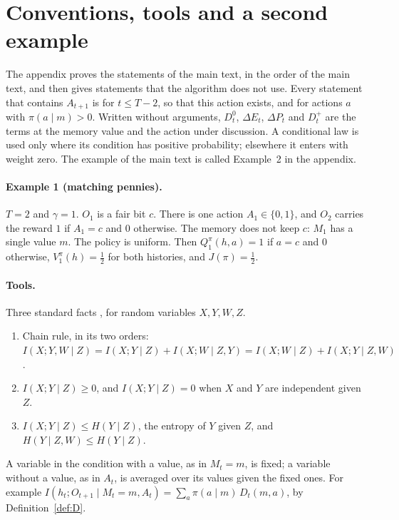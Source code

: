 \documentclass{article}
\newcounter{algo}
\theoremstyle{definition}
\newcommand{\dE}{\Delta E}
\newcommand{\dP}{\Delta P}
\begin{document}
\section{Conventions, tools and a second example}\label{sec:conv}

The appendix proves the statements of the main text, in the order of the main text, and then gives statements that the algorithm does not use. Every statement that contains $A_{t+1}$ is for $t\le T-2$, so that this action exists, and for actions $a$ with $\pi(a\mid m)>0$. Written without arguments, $D^0_t$, $\dE_t$, $\dP_t$ and $D^+_t$ are the terms at the memory value and the action under discussion. A conditional law is used only where its condition has positive probability; elsewhere it enters with weight zero. The example of the main text is called Example~2 in the appendix.

\paragraph{Example 1 (matching pennies).} $T=2$ and $\gamma=1$. $O_1$ is a fair bit $c$. There is one action $A_1\in\{0,1\}$, and $O_2$ carries the reward $1$ if $A_1=c$ and $0$ otherwise. The memory does not keep $c$: $M_1$ has a single value $m$. The policy is uniform. Then $Q^\pi_1(h,a)=1$ if $a=c$ and $0$ otherwise, $V^\pi_1(h)=\tfrac12$ for both histories, and $J(\pi)=\tfrac12$.

\paragraph{Tools.} Three standard facts \citep[Ch.~2]{cover2006elements}, for random variables $X,Y,W,Z$.
\begin{enumerate}
\item[(T1)] Chain rule, in its two orders: $I(X;Y,W\mid Z)=I(X;Y\mid Z)+I(X;W\mid Z,Y)=I(X;W\mid Z)+I(X;Y\mid Z,W)$.
\item[(T2)] $I(X;Y\mid Z)\ge0$, and $I(X;Y\mid Z)=0$ when $X$ and $Y$ are independent given $Z$.
\item[(T3)] $I(X;Y\mid Z)\le H(Y\mid Z)$, the entropy of $Y$ given $Z$, and $H(Y\mid Z,W)\le H(Y\mid Z)$.
\end{enumerate}
A variable in the condition with a value, as in $M_t=m$, is fixed; a variable without a value, as in $A_t$, is averaged over its values given the fixed ones. For example $I(h_t;O_{t+1}\mid M_t=m,A_t)=\sum_a\pi(a\mid m)\,D_t(m,a)$, by Definition~\ref{def:D}.
\end{document}
